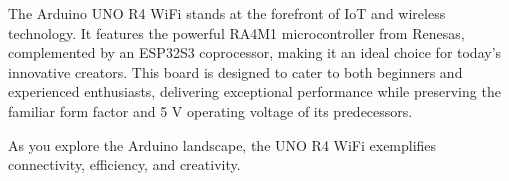 \documentclass[a4paper,11pt,english]{sphinxmanual}
\begin{document}
\sphinxAtStartPar
The Arduino UNO R4 WiFi stands at the forefront of IoT and wireless technology. It features the powerful RA4M1 microcontroller from Renesas, complemented by an ESP32\sphinxhyphen{}S3 coprocessor, making it an ideal choice for today’s innovative creators. This board is designed to cater to both beginners and experienced enthusiasts, delivering exceptional performance while preserving the familiar form factor and 5 V operating voltage of its predecessors.

\sphinxAtStartPar
As you explore the Arduino landscape, the UNO R4 WiFi exemplifies connectivity, efficiency, and creativity.

\end{document}
